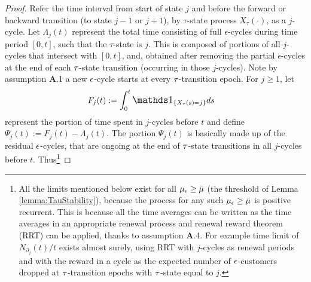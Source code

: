 \begin{proof}
Refer   
the  time interval from start of state $j$ and  before the forward or backward transition (to state $j-1$ or $j+1$), by $\tau$-state process $X_\tau (\cdot)$,  as   
a  $j$-cycle. 
Let $\Lambda_{j}(t)$ represent the total time consisting of full $\epsilon$-cycles during time  period $[0, t]$, such that the $\tau$-state is $j$. 
This is composed  of portions of all  $j$-cycles that intersect with $[0, t]$, and,  obtained after removing the partial $\epsilon$-cycles at the end of each ${\tau}$-state transition (occurring in those $j$-cycles). Note  by assumption {\bf A}.1 a new ${ \epsilon }$-cycle starts at every ${\tau}$-transition epoch.  
For $ j \geq 1 $,  let 
$$
F_{j } (t): =  \int_0^t \indc_{\{ X_\tau (s) = j\}} ds \ \ \mbox{  }  
$$represent the  portion of time spent in $j$-cycles before $t$ and   define $\Psi_{j} (t) := F_{j} (t) - \Lambda_{j}(t)$. 
The portion $\Psi_{j} (t)$  is  basically made up of  the  residual   ${ \epsilon }$-cycles, that are ongoing  at  the end  of ${\tau}$-state transitions in all $j$-cycles before $t$.
Thus\footnote{All the limits mentioned below exist for all $\mu_{ \epsilon } \ge {\bar \mu}$  (the threshold of Lemma \ref{lemma:TauStability}), because  the process for any such  $\mu_{ \epsilon } \ge {\bar \mu}$  is positive recurrent.
This is because all the time averages  can be written as the time averages in an appropriate renewal process and renewal reward theorem (RRT) can be applied, thanks to assumption {\bf A}.4. 
For example time limit of  $N_{\partial_j} (t) / { t}  $  exists almost surely,   using  RRT with 
 $j$-cycles as renewal periods and with the reward in a cycle as the expected number of ${ \epsilon }$-customers dropped  at ${\tau}$-transition epochs with ${\tau}$-state  equal to $j$. 
}
\end{proof}

